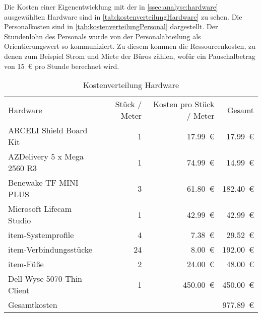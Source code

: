 Die Kosten einer Eigenentwicklung mit der in \vref{ssec:analyse:hardware} ausgewählten Hardware sind in \vref{tab:kostenverteilungHardware} zu sehen. Die  Personalkosten sind in \vref{tab:kostenverteilungPersonal} dargestellt. Der Stundenlohn des Personals wurde von der Personalabteilung als Orientierungswert so kommuniziert. Zu diesem kommen die Ressourcenkosten, zu denen zum Beispiel Strom und Miete der Büros zählen, wofür ein Pauschalbetrag von \SI{15}{€} pro Stunde berechnet wird.


\begin{table}[htbp]
  \centering
  \renewcommand{\arraystretch}{1.25}
  \caption{Kostenverteilung Hardware}
  \begin{tabular}{lrrr}
    Hardware                    & Stück / Meter & Kosten pro Stück / Meter & Gesamt         \\
    ARCELI Shield Board Kit     & 1             & \SI{17.99}{€}            & \SI{17.99}{€}  \\
    AZDelivery 5 x Mega 2560 R3 & 1             & \SI{74.99}{€}            & \SI{14.99}{€}  \\
    Benewake TF MINI PLUS       & 3             & \SI{61.80}{€}            & \SI{182.40}{€} \\
    Microsoft Lifecam Studio    & 1             & \SI{42.99}{€}            & \SI{42.99}{€}  \\
    item-Systemprofile          & 4             & \SI{7.38}{€}             & \SI{29.52}{€}  \\
    item-Verbindungsstücke      & 24            & \SI{8.00}{€}             & \SI{192.00}{€} \\
    item-Füße                   & 2             & \SI{24.00}{€}            & \SI{48.00}{€}  \\
    Dell Wyse 5070 Thin Client  & 1             & \SI{450.00}{€}           & \SI{450.00}{€} \\
    \hline
    Gesamtkosten                &               &                          & \SI{977.89}{€}
  \end{tabular}
  \label{tab:kostenverteilungHardware}
\end{table}


